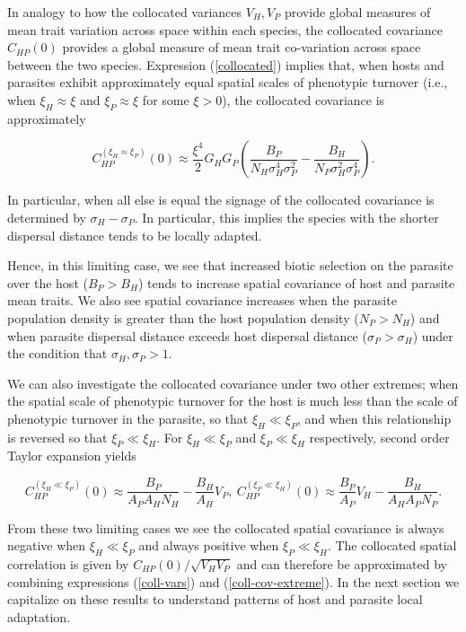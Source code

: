 \documentclass{article}
\begin{document}
In analogy to how the collocated variances \(V_H,V_P\) provide global
measures of mean trait variation across space within each species, the
collocated covariance \(C_{HP}(0)\) provides a global measure of mean
trait co-variation across space between the two species. Expression
(\ref{collocated}) implies that, when hosts and parasites exhibit
approximately equal spatial scales of phenotypic turnover (i.e., when
\(\xi_H\approx\xi\) and \(\xi_P\approx\xi\) for some \(\xi>0\)), the
collocated covariance is approximately

\begin{equation}
  C_{HP}^{(\xi_H\approx\xi_P)}(0)\approx \frac{\xi^4}{2}G_HG_P\left(\frac{B_P}{ N_H\sigma_H^4\sigma_P^2}-\frac{B_H}{ N_P\sigma_H^2\sigma_P^4}\right).
\end{equation}

In particular, when all else is equal the signage of the collocated
covariance is determined by \(\sigma_H-\sigma_P\). In particular, this
implies the species with the shorter dispersal distance tends to be
locally adapted.

Hence, in this limiting case, we see that increased biotic selection on
the parasite over the host (\(B_P>B_H\)) tends to increase spatial
covariance of host and parasite mean traits. We also see spatial
covariance increases when the parasite population density is greater
than the host population density (\(N_P>N_H\)) and when parasite
dispersal distance exceeds host dispersal distance
(\(\sigma_P>\sigma_H\)) under the condition that
\(\sigma_H,\sigma_P>1\).

We can also investigate the collocated covariance under two other
extremes; when the spatial scale of phenotypic turnover for the host is
much less than the scale of phenotypic turnover in the parasite, so that
\(\xi_H\ll\xi_P\), and when this relationship is reversed so that
\(\xi_P\ll\xi_H\). For \(\xi_H\ll\xi_P\) and \(\xi_P\ll\xi_H\)
respectively, second order Taylor expansion yields

\begin{equation}\label{coll-cov-extreme}
  C_{HP}^{(\xi_H\ll\xi_P)}(0)\approx\frac{B_P}{A_PA_HN_H}-\frac{B_H}{A_H}V_P, \ C_{HP}^{(\xi_P\ll\xi_H)}(0)\approx\frac{B_P}{A_P}V_H-\frac{B_H}{A_HA_PN_P}.
\end{equation}

From these two limiting cases we see the collocated spatial covariance
is always negative when \(\xi_H\ll\xi_P\) and always positive when
\(\xi_P\ll\xi_H\). The collocated spatial correlation is given by
\(C_{HP}(0)/\sqrt{V_HV_P}\) and can therefore be approximated by
combining expressions (\ref{coll-vars}) and (\ref{coll-cov-extreme}). In
the next section we capitalize on these results to understand patterns
of host and parasite local adaptation.
\end{document}

